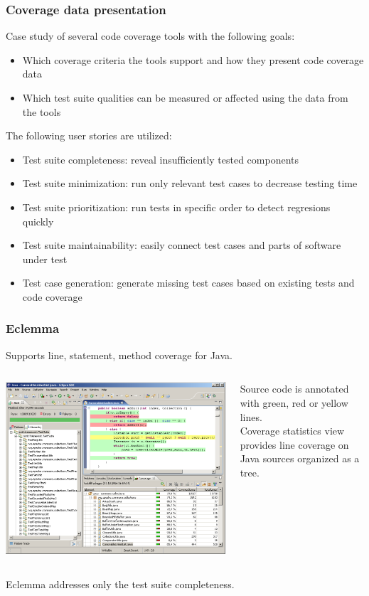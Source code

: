 \documentclass{beamer}
\begin{document}
\begin{frame}
  \frametitle{Coverage data presentation}
Case study of several code coverage tools with the following goals:
\begin{itemize}
  \item Which coverage criteria the tools support and how they present code coverage data
  \item Which test suite qualities can be measured or affected using the data from the tools
\end{itemize}
\pause
The following user stories are utilized:
\begin{itemize}
  \item Test suite completeness: reveal insufficiently tested components
  \item Test suite minimization: run only relevant test cases to decrease testing time
  \item Test suite prioritization: run tests in specific order to detect regresions quickly
  \item Test suite maintainability: easily connect test cases and parts of software under test
  \item Test case generation: generate missing test cases based on existing tests and code coverage
\end{itemize}
\end{frame}

\begin{frame}
  \frametitle{Eclemma}
Supports line, statement, method coverage for Java.
\begin{columns}[T]
\begin{column}{.7\textwidth}
    \includegraphics[scale=0.25]{eclemma.png}
\end{column}
\begin{column}{.3\textwidth}
Source code is annotated with green, red or yellow lines.\\
Coverage statistics view provides line coverage on Java sources organized as a tree.
\end{column}
\end{columns}
Eclemma addresses only the test suite completeness.
\end{frame}
\end{document}
